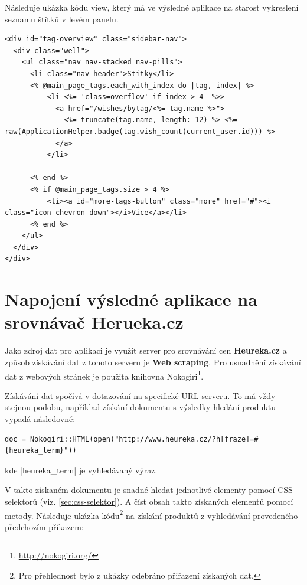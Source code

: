 Následuje ukázka kódu view, který má ve výsledné aplikace na starost vykreslení seznamu štítků v levém panelu.

\lstset{language = html, style=custom}
\begin{lstlisting}
<div id="tag-overview" class="sidebar-nav">
  <div class="well">
    <ul class="nav nav-stacked nav-pills">
      <li class="nav-header">Stitky</li>
      <% @main_page_tags.each_with_index do |tag, index| %>
          <li <%= 'class=overflow' if index > 4  %>>
            <a href="/wishes/bytag/<%= tag.name %>">
              <%= truncate(tag.name, length: 12) %> <%= raw(ApplicationHelper.badge(tag.wish_count(current_user.id))) %>
            </a>
          </li>

      <% end %>
      <% if @main_page_tags.size > 4 %>
          <li><a id="more-tags-button" class="more" href="#"><i class="icon-chevron-down"></i>Vice</a></li>
      <% end %>
    </ul>
  </div>
</div>
\end{lstlisting}

\section{Napojení výsledné aplikace na srovnávač Herueka.cz}
Jako zdroj dat pro aplikaci je využit server pro srovnávání cen \textbf{Heureka.cz} a způsob získávání dat z tohoto serveru je \textbf{Web scraping}. Pro usnadnění získávání dat z webových stránek je použita knihovna Nokogiri\footnote{\url{http://nokogiri.org/}}.

Získávání dat spočívá v dotazování na specifické URL serveru. To má vždy stejnou podobu, například získání dokumentu s výsledky hledání produktu vypadá následovně:

\lstset{language = ruby, style=custom}
\begin{lstlisting}
doc = Nokogiri::HTML(open("http://www.heureka.cz/?h[fraze]=#{heureka_term}"))
\end{lstlisting}

\noindent kde |heureka_term| je vyhledávaný výraz.

V takto získaném dokumentu je snadné hledat jednotlivé elementy pomocí CSS selektorů (viz. \ref{sec:css-selektor}). A číst obsah takto získaných elementů pomocí metody. Následuje ukázka kódu\footnote{Pro přehlednost bylo z ukázky odebráno přiřazení získaných dat.} na získání produktů z vyhledávání provedeného předchozím příkazem:

